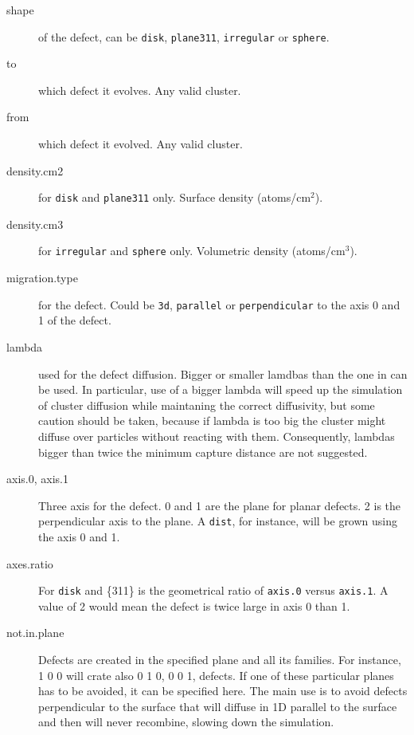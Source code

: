 \begin{description}
\item [shape] of the defect, can be {\tt disk}, {\tt plane311}, {\tt irregular} or {\tt sphere}.

\item [to] which defect it evolves. Any valid cluster.

\item [from] which defect it evolved. Any valid cluster.

\item [density.cm2] for {\tt disk} and  {\tt plane311} only. Surface density (atoms/cm$^{2}$).

\item [density.cm3] for {\tt irregular} and {\tt sphere} only. Volumetric density (atoms/cm$^{3}$).

\item [migration.type] for the defect. Could be {\tt 3d}, {\tt parallel} or {\tt perpendicular} to the axis 0 and 1 of the defect.

\item[lambda] used for the defect diffusion. Bigger or smaller lamdbas than the one in  can be used. In particular, use of a bigger lambda will speed up the simulation of cluster diffusion while maintaning the correct diffusivity, but some caution should be taken, because if lambda is too big the cluster might diffuse over particles without reacting with them. Consequently, lambdas bigger than twice the minimum capture distance are not suggested.

\item [axis.0, axis.1] Three axis for the defect. 0 and 1 are the plane for planar defects. 2 is the perpendicular axis to the plane. A {\tt dist}, for instance, will be grown using the axis 0 and 1.

\item [axes.ratio] For {\tt disk} and \{311\} is the geometrical ratio of {\tt axis.0} versus {\tt axis.1}. A value of 2 would mean the defect is twice large in axis 0 than 1.

\item [not.in.plane] Defects are created in the specified plane and all its families. For instance, 1 0 0 will crate also 0 1 0, 0 0 1, defects. If one of these particular planes has to be avoided, it can be specified here. The main use is to avoid defects perpendicular to the surface that will diffuse in 1D parallel to the surface and then will never recombine, slowing down the simulation.


\end{description}
